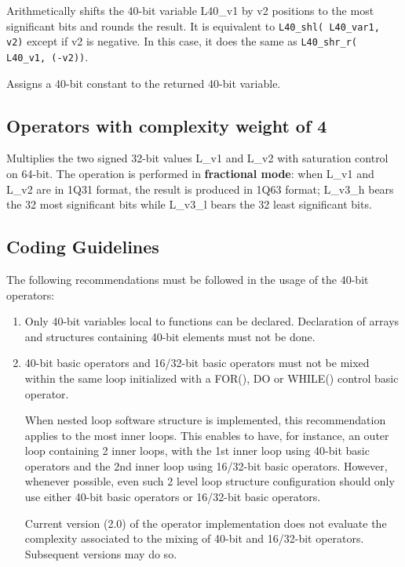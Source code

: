 \newpage
{}

Arithmetically shifts the 40-bit variable L40\_v1 by v2 positions
to the most significant bits and rounds the result. It is
equivalent to {\tt L40\_shl( L40\_var1, v2)} except if v2 is negative.
In this case, it does the same as {\tt L40\_shr\_r( L40\_v1, (-v2))}.


Assigns a 40-bit constant to the returned 40-bit variable.

\subsection{Operators with complexity weight of 4}


Multiplies the two signed 32-bit values L\_v1 and L\_v2 with saturation
control on 64-bit. The operation is performed in \textbf{fractional
mode}: when L\_v1 and L\_v2 are in 1Q31 format, the result is produced
in 1Q63 format; L\_v3\_h bears the 32 most significant bits while
L\_v3\_l bears the 32 least significant bits.

\subsection{Coding Guidelines}

The following recommendations must be followed in the usage of the
40-bit operators:
\begin{enumerate}
    \item Only 40-bit variables local to functions can be declared.
    Declaration of arrays and structures containing 40-bit elements
    must not be done.
    \item 40-bit basic operators and 16/32-bit basic
    operators must not be mixed within the same loop initialized with
    a FOR(), DO or WHILE() control basic operator.

    When nested loop software structure is implemented, this
    recommendation applies to the most inner loops. This enables to
    have, for instance, an outer loop containing 2 inner loops, with
    the 1st inner loop using 40-bit basic operators and the 2nd inner
    loop using 16/32-bit basic operators. However, whenever possible,
    even such 2 level loop structure configuration should only use
    either 40-bit basic operators or 16/32-bit basic operators.

    Current version (2.0) of the operator implementation does not
    evaluate the complexity associated to the mixing of 40-bit and
    16/32-bit operators. Subsequent versions may do so.
\end{enumerate}

